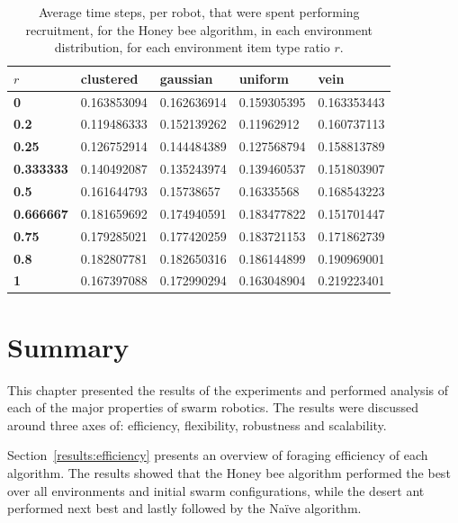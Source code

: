 \begin{table}[]
\centering
\caption{Average time steps, per robot, that were spent performing recruitment, for the Honey bee algorithm, in each environment distribution, for each environment item type ratio $r$.}
\label{averagetimerecruitment}
\begin{tabular}{@{}lllll@{}}
\toprule
$r$            & \textbf{clustered} & \textbf{gaussian} & \textbf{uniform} & \textbf{vein} \\ \midrule
\textbf{0}        & 0.163853094        & 0.162636914       & 0.159305395      & 0.163353443   \\
\textbf{0.2}      & 0.119486333        & 0.152139262       & 0.11962912       & 0.160737113   \\
\textbf{0.25}     & 0.126752914        & 0.144484389       & 0.127568794      & 0.158813789   \\
\textbf{0.333333} & 0.140492087        & 0.135243974       & 0.139460537      & 0.151803907   \\
\textbf{0.5}      & 0.161644793        & 0.15738657        & 0.16335568       & 0.168543223   \\
\textbf{0.666667} & 0.181659692        & 0.174940591       & 0.183477822      & 0.151701447   \\
\textbf{0.75}     & 0.179285021        & 0.177420259       & 0.183721153      & 0.171862739   \\
\textbf{0.8}      & 0.182807781        & 0.182650316       & 0.186144899      & 0.190969001   \\
\textbf{1}        & 0.167397088        & 0.172990294       & 0.163048904      & 0.219223401   \\ \bottomrule
\end{tabular}
\end{table}

\section{Summary}
\label{results:summary}

This chapter presented the results of the experiments and performed analysis of each of the major properties of swarm robotics. The results were discussed around three axes of: efficiency, flexibility, robustness and scalability. 

Section~\ref{results:efficiency} presents an overview of foraging efficiency of each algorithm. The results showed that the Honey bee algorithm performed the best over all environments and initial swarm configurations, while the desert ant performed next best and lastly followed by the Na\"ive algorithm.

